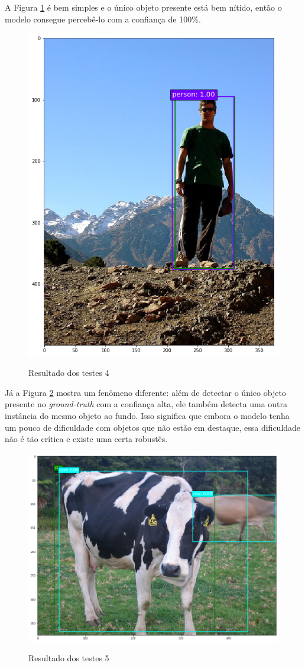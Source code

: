 A Figura \ref{fig:teste_4} é bem simples e o único objeto presente está bem nítido, então o modelo consegue percebê-lo com a confiança de 100\%.

\begin{figure}[H]
	\setlength{\abovecaptionskip}{0pt}
	\setlength{\belowcaptionskip}{0pt}
	\caption[Resultado dos testes 4]{Resultado dos testes 4}
	\centering
	\includegraphics[width=.6\textwidth]{imagem/test_image_2.png}
	\captionsetup{justification=centering}
	\label{fig:teste_4}
\end{figure}

Já a Figura \ref{fig:teste_5} mostra um fenômeno diferente: além de detectar o único objeto presente no \textit{ground-truth} com a confiança alta, ele também detecta uma outra instância do mesmo objeto ao fundo. Isso significa que embora o modelo tenha um pouco de dificuldade com objetos que não estão em destaque, essa dificuldade não é tão crítica e existe uma certa robustês.

\begin{figure}[H]
	\setlength{\abovecaptionskip}{0pt}
	\setlength{\belowcaptionskip}{0pt}
	\caption[Resultado dos testes 5]{Resultado dos testes 5}
	\centering
	\includegraphics[width=.6\textwidth]{imagem/test_image_4.png}
	\captionsetup{justification=centering}
	\label{fig:teste_5}
\end{figure}


